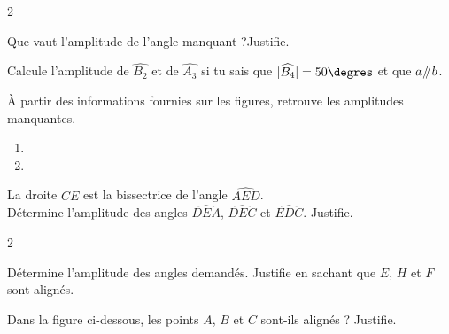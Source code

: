 \documentclass[../math2.tex]{subfiles}
\begin{document}
\setlength{\columnsep}{20pt}
\begin{multicols}{2}
\begin{exercise}
    Que vaut l'amplitude de l'angle manquant ?Justifie.
    \begin{center}
        
    \end{center}
\end{exercise}

\begin{exercise}
    Calcule l'amplitude de $\widehat{B_2}$ et de $\widehat{A_3}$ si tu sais que $|\widehat{B_4}|=50\degres$ et que $a \mathbin{\!/\mkern-5mu/\!} b$.
    \begin{center}
        
    \end{center}
\end{exercise}
\end{multicols}
\setlength{\columnsep}{10pt}

\begin{exercise}
    À partir des informations fournies sur les figures, retrouve les amplitudes manquantes.
    \begin{enumerate}[cols=2]
        \item 
        \item 
    \end{enumerate}
\end{exercise}

\begin{exercise}
    La droite $CE$ est la bissectrice de l'angle $\widehat{AED}$.\\
    Détermine l'amplitude des angles $\widehat{DEA}$, $\widehat{DEC}$ et $\widehat{EDC}$. Justifie.
    \begin{center}
        
    \end{center}
\end{exercise}
\newpage

\setlength{\columnsep}{20pt}
\begin{multicols}{2}
\begin{exercise}
        Détermine l'amplitude des angles demandés. Justifie en sachant que $E$, $H$ et $F$ sont alignés.
        \begin{center}
            
        \end{center}
\end{exercise}

\begin{exercise}
    Dans la figure ci-dessous, les points $A$, $B$ et $C$ sont-ils alignés ? Justifie. 
    \begin{center}
        
    \end{center}
\end{exercise}
\end{multicols}
\end{document}

